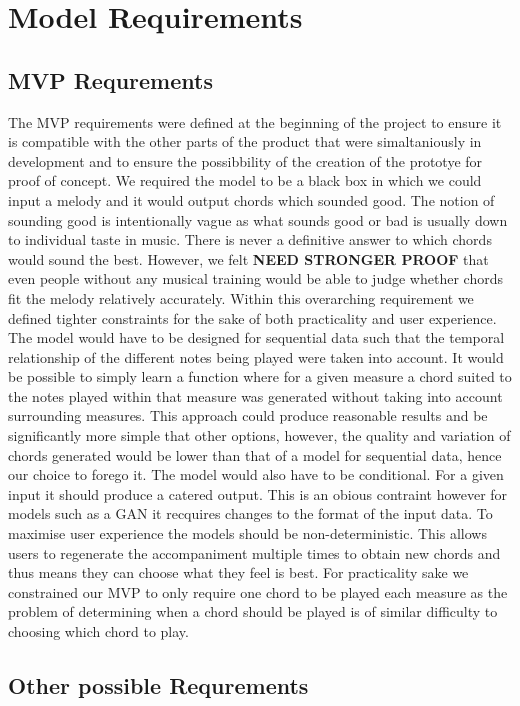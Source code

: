 \section{Model Requirements}
\label{sec:Evaluation}
\subsection{MVP Requrements}
\label{sec:MVPRequirements}
The MVP requirements were defined at the beginning of the project to ensure it is compatible with the other parts of the product that were simaltaniously in development and to ensure the possibbility of the creation of the prototye for proof of concept. 
We required the model to be a black box in which we could input a melody and it would output chords which sounded good.
The notion of sounding good is intentionally vague as what sounds good or bad is usually down to individual taste in music.
There is never a definitive answer to which chords would sound the best.
However, we felt \textbf{NEED STRONGER PROOF} that even people without any musical training would be able to judge whether chords fit the melody relatively accurately.
Within this overarching requirement we defined tighter constraints for the sake of both practicality and user experience. 
The model would have to be designed for sequential data such that the temporal relationship of the different notes being played were taken into account.
It would be possible to simply learn a function where for a given measure a chord suited to the notes played within that measure was generated without taking into account surrounding measures.
This approach could produce reasonable results and be significantly more simple that other options, however, the quality and variation of chords generated would be lower than that of a model for sequential data, hence our choice to forego it.
The model would also have to be conditional. For a given input it should produce a catered output. This is an obious contraint however for models such as a GAN it recquires changes to the format of the input data.
To maximise user experience the models should be non-deterministic. This allows users to regenerate the accompaniment multiple times to obtain new chords and thus means they can choose what they feel is best.
For practicality sake we constrained our MVP to only require one chord to be played each measure as the problem of determining when a chord should be played is of similar difficulty to choosing which chord to play.
\subsection{Other possible Requrements}

